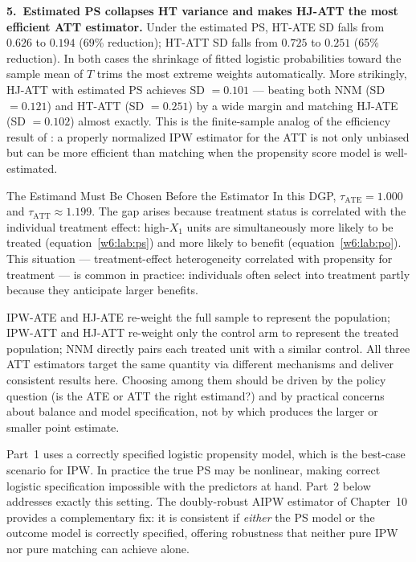 \documentclass[master.tex]{subfiles}
\begin{document}
\medskip
\noindent\textbf{5.\ Estimated PS collapses HT variance and makes
HJ-ATT the most efficient ATT estimator.}
Under the estimated PS, HT-ATE SD falls from $0.626$ to $0.194$ (69\%
reduction); HT-ATT SD falls from $0.725$ to $0.251$ (65\% reduction).
In both cases the shrinkage of fitted logistic probabilities toward the
sample mean of $T$ trims the most extreme weights automatically.  More
strikingly, HJ-ATT with estimated PS achieves SD $= 0.101$ --- beating
both NNM (SD $= 0.121$) and HT-ATT (SD $= 0.251$) by a wide margin and
matching HJ-ATE (SD $= 0.102$) almost exactly.  This is the finite-sample
analog of the efficiency result of \citet{imbens2015causal}: a
properly normalized IPW estimator for the ATT is not only unbiased but
can be more efficient than matching when the propensity score model is
well-estimated.

\begin{warn}{The Estimand Must Be Chosen Before the Estimator}
In this DGP, $\tau_{\mathrm{ATE}} = 1.000$ and
$\tau_{\mathrm{ATT}} \approx 1.199$.  The gap arises because treatment
status is correlated with the individual treatment effect: high-$X_1$
units are simultaneously more likely to be treated
(equation~\eqref{w6:lab:ps}) and more likely to benefit
(equation~\eqref{w6:lab:po}).  This situation --- treatment-effect
heterogeneity correlated with propensity for treatment
\citep{imbens2015causal} --- is common in practice: individuals often
select into treatment partly because they anticipate larger benefits.

IPW-ATE and HJ-ATE re-weight the full sample to represent the
population; IPW-ATT and HJ-ATT re-weight only the control arm to
represent the treated population; NNM directly pairs each treated unit
with a similar control.  All three ATT estimators target the same
quantity via different mechanisms and deliver consistent results here.
Choosing among them should be driven by the policy question (is the
ATE or ATT the right estimand?) and by practical concerns about balance
and model specification, not by which produces the larger or smaller
point estimate.
\end{warn}

\begin{remark}
\label{w6:rem:lab-limits}
Part~1 uses a correctly specified logistic propensity model, which is
the best-case scenario for IPW.  In practice the true PS may be
nonlinear, making correct logistic specification impossible with the
predictors at hand.  Part~2 below addresses exactly this setting.  The
doubly-robust AIPW estimator of Chapter~10 provides a complementary
fix: it is consistent if \emph{either} the PS model or the outcome
model is correctly specified, offering robustness that neither pure IPW
nor pure matching can achieve alone.
\end{remark}
\end{document}
